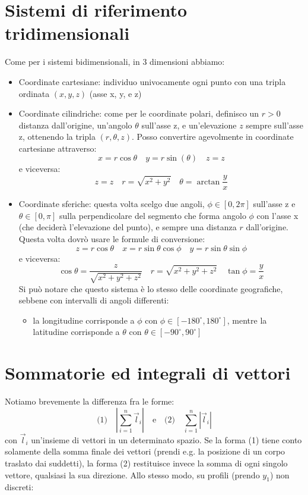 \documentclass[a4paper,12pt]{article}
\begin{document}
\section{Sistemi di riferimento tridimensionali}
Come per i sistemi bidimensionali, in 3 dimensioni abbiamo:
\begin{itemize}
  \item Coordinate cartesiane:
    individuo univocamente ogni punto con una tripla ordinata $ (x, y, z) $ (asse x, y, e z)
  \item Coordinate cilindriche:
    come per le coordinate polari, definisco un $ r > 0 $ distanza dall'origine, un'angolo $\theta$ sull'asse z,
    e un'elevazione $z$ sempre sull'asse z, ottenendo la tripla $ (r, \theta, z) $.
    Posso convertire agevolmente in coordinate cartesiane attraverso:
    $$ x = r \cos{\theta} \quad
    y = r \sin(\theta) \quad
    z = z $$
    e viceversa:
    $$ z = z \quad
    r = \sqrt{x^2 + y^2} \quad
    \theta = \arctan{\frac{y}{x}} $$
  \item Coordinate sferiche:
    questa volta scelgo due angoli, $\phi \in [0, 2\pi]$ sull'asse z e $\theta \in [0, \pi]$ sulla perpendicolare del segmento che forma 
    angolo $\phi$ con l'asse x (che deciderà l'elevazione del punto), e sempre una distanza $r$ dall'origine.
    Questa volta dovrò usare le formule di conversione:
    $$ z = r \cos{\theta} \quad
    x = r \sin{\theta} \cos{\phi} \quad
    y = r \sin{\theta} \sin{\phi} $$
    e viceversa:
    $$ \cos{\theta} = \frac{z}{\sqrt{x^2 + y^2 + z^2}} \quad
    r = \sqrt{x^2 + y^2 + z^2} \quad
    \tan{\phi} = \frac{y}{x} $$
    Si può notare che questo sistema è lo stesso delle coordinate geografiche, sebbene con intervalli di angoli
    differenti:
    \begin{itemize}
      \item la longitudine corrisponde a $\phi$ con $\phi \in [-180^{\circ}, 180^{\circ}] $, mentre la latitudine
        corrisponde a $\theta$ con $\theta \in [-90^{\circ}, 90^{\circ}] $
    \end{itemize}
\end{itemize}

\section{Sommatorie ed integrali di vettori}
Notiamo brevemente la differenza fra le forme:
$$ \textrm{(1)} \quad | \sum_{i = 1}^n \vec{l}_i| \quad \textrm{e} \quad \textrm{(2)} \quad \sum_{i = 1}^n | \vec{l}_i | $$
con $\vec{l}_i$ un'insieme di vettori in un determinato spazio. Se la forma (1) tiene conto solamente della
somma finale dei vettori (prendi e.g. la posizione di un corpo traslato dai suddetti), la forma (2) restituisce
invece la somma di ogni singolo vettore, qualsiasi la sua direzione. Allo stesso modo, su profili (prendo $y_1$) non discreti:
\end{document}
